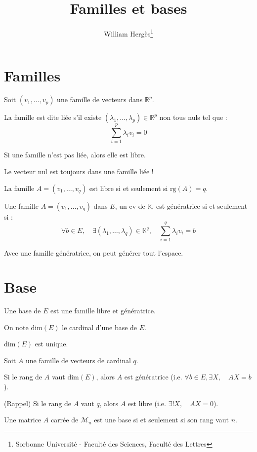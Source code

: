 \documentclass[a4paper, titlepage]{article}
\title{Familles et bases}
\author{William Hergès\thanks{Sorbonne Université - Faculté des Sciences, Faculté des Lettres}}
\begin{document}
	\maketitle
	\tableofcontents
	\newpage
	\section{Familles}
	\begin{defn}
		Soit $(v_1,\ldots,v_p)$ une famille de vecteurs dans $\mathbb{R}^p$.

		La famille est dite liée s'il existe $(\lambda_1,\ldots,\lambda_p)\in\mathbb{R}^p$ non tous nuls tel que :
		$$ \sum_{i=1}^{p} \lambda_iv_i = 0 $$
	\end{defn}
	\begin{defn}
		Si une famille n'est pas liée, alors elle est libre.
	\end{defn}
	Le vecteur nul est toujours dans une famille liée !

	\begin{thm}
		La famille $A=(v_1,\ldots,v_q)$ est libre si et seulement si $\mathrm{rg}(A)=q$.
	\end{thm}

	\begin{defn}
		Une famille $A=(v_1,\ldots,v_q)$ dans $E$, un ev de $\mathbb{K}$, est génératrice si et seulement si :
		$$ \forall b\in E,\quad \exists(\lambda_1,\ldots,\lambda_q)\in\mathbb{K}^q,\quad \sum_{i=1}^{q} \lambda_iv_i = b $$
	\end{defn}
	Avec une famille génératrice, on peut générer tout l'espace.
	\section{Base}
	\begin{defn}
		Une base de $E$ est une famille libre et génératrice.

		On note $\mathrm{dim}(E)$ le cardinal d'une base de $E$.
	\end{defn}
	$\mathrm{dim}(E)$ est unique.

	\begin{thm}
		Soit $A$ une famille de vecteurs de cardinal $q$.

		Si le rang de $A$ vaut $\mathrm{dim}(E)$, alors $A$ est génératrice (i.e. $\forall b\in E,\exists X,\quad AX=b$).

		(Rappel) Si le rang de $A$ vaut $q$, alors $A$ est libre (i.e. $\exists!X,\quad AX=0$).
	\end{thm}
	Une matrice $A$ carrée de $\mathcal{M}_n$ est une base si et seulement si son rang vaut $n$.
\end{document}
